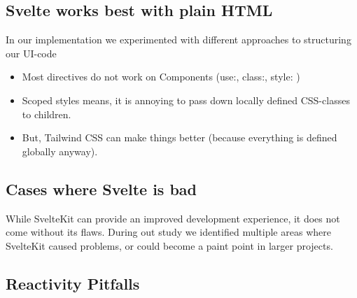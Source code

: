 \subsection{Svelte works best with plain HTML}

In our implementation we experimented with different approaches to structuring our UI-code

\begin{itemize}
    \item Most directives do not work on Components (use:, class:, style: )
    \item Scoped styles means, it is annoying to pass down locally defined CSS-classes to children.
    \item But, Tailwind CSS can make things better (because everything is defined globally anyway).
\end{itemize}


\subsection{Cases where Svelte is bad}


While SvelteKit can provide an improved development experience, it does not come without its flaws. During out study we identified multiple areas where SvelteKit caused problems, or could become a paint point in larger projects.

\subsection{Reactivity Pitfalls}

